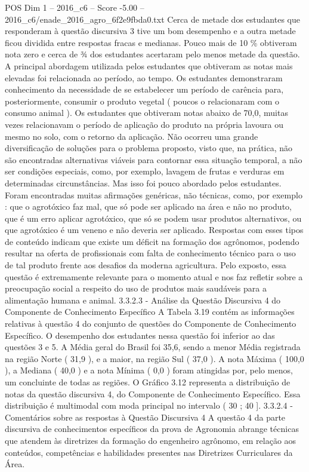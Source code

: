\begin{textsample}{POS Dim 1 – 2016\_c6 – Score -5.00 – 2016\_c6/enade\_2016\_agro\_6f2e9fbda0.txt}
Cerca de metade dos estudantes que responderam à questão discursiva 3 tive um bom desempenho e a outra metade ficou dividida entre respostas fracas e medianas.
Pouco mais de 10 \% obtiveram nota zero e cerca de ¾ dos estudantes acertaram pelo menos metade da questão.
A principal abordagem utilizada pelos estudantes que obtiveram as notas mais elevadas foi relacionada ao período, ao tempo.
Os estudantes demonstraram conhecimento da necessidade de se estabelecer um período de carência para, posteriormente, consumir o produto vegetal ( poucos o relacionaram com o consumo animal ).
Os estudantes que obtiveram notas abaixo de 70,0, muitas vezes relacionavam o período de aplicação do produto na própria lavoura ou mesmo no solo, com o retorno da aplicação.
Não ocorreu uma grande diversificação de soluções para o problema proposto, visto que, na prática, não são encontradas alternativas viáveis para contornar essa situação temporal, a não ser condições especiais, como, por exemplo, lavagem de frutas e verduras em determinadas circunstâncias.
Mas isso foi pouco abordado pelos estudantes.
Foram encontradas muitas afirmações genéricas, não técnicas, como, por exemplo : que o agrotóxico faz mal, que só pode ser aplicado na área e não no produto, que é um erro aplicar agrotóxico, que só se podem usar produtos alternativos, ou que agrotóxico é um veneno e não deveria ser aplicado.
Respostas com esses tipos de conteúdo indicam que existe um déficit na formação dos agrônomos, podendo resultar na oferta de profissionais com falta de conhecimento técnico para o uso de tal produto frente aos desafios da moderna agricultura.
Pelo exposto, essa questão é extremamente relevante para o momento atual e nos faz refletir sobre a preocupação social a respeito do uso de produtos mais saudáveis para a alimentação humana e animal. 3.3.2.3 - Análise da Questão Discursiva 4 do Componente de Conhecimento Específico A Tabela 3.19 contém as informações relativas à questão 4 do conjunto de questões do Componente de Conhecimento Específico.
O desempenho dos estudantes nessa questão foi inferior ao das questões 3 e 5.
A Média geral do Brasil foi 35,6, sendo a menor Média registrada na região Norte ( 31,9 ), e a maior, na região Sul ( 37,0 ).
A nota Máxima ( 100,0 ), a Mediana ( 40,0 ) e a nota Mínima ( 0,0 ) foram atingidas por, pelo menos, um concluinte de todas as regiões.
O Gráfico 3.12 representa a distribuição de notas da questão discursiva 4, do Componente de Conhecimento Específico.
Essa distribuição é multimodal com moda principal no intervalo ( 30 ; 40 ]. 3.3.2.4 - Comentários sobre as respostas à Questão Discursiva 4 A questão 4 da parte discursiva de conhecimentos específicos da prova de Agronomia abrange técnicas que atendem às diretrizes da formação do engenheiro agrônomo, em relação aos conteúdos, competências e habilidades presentes nas Diretrizes Curriculares da Área.

\end{textsample}
